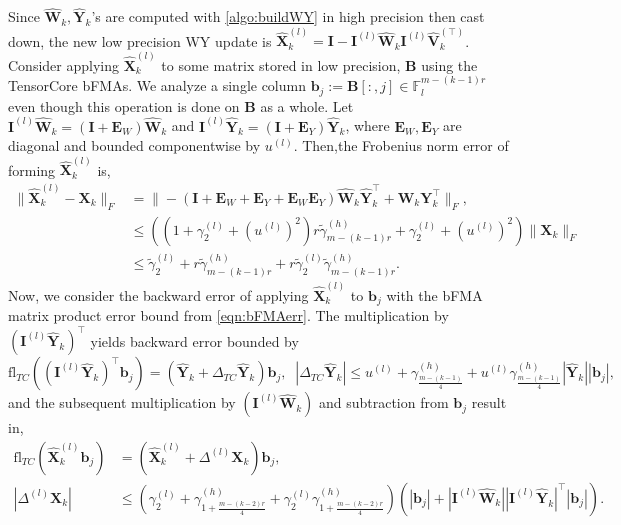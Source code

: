 \documentclass[review,onefignum,onetabnum]{siamart190516}
\newcommand{\F}{\mathbb{F}}
\newcommand{\bb}[1]{\mathbf{#1}}
\newcommand{\fl}{\mathrm{fl}}
\begin{document}
Since $\hat{\bb{W}}_{k},\hat{\bb{Y}}_k$'s are computed with \cref{algo:buildWY} in high precision then cast down, the new low precision WY update is $\hat{\bb{X}}_{k}^{(l)} = \bb{I}-\bb{I}^{(l)}\hat{\bb{W}}_k\bb{I}^{(l)}\hat{\bb{V}}_k^{(\top)}$.
Consider applying $\hat{\bb{X}}_k^{(l)}$ to some matrix stored in low precision, $\bb{B}$ using the TensorCore bFMAs.
We analyze a single column $\bb{b}_j:=\bb{B}[:,j] \in \F_l^{m-(k-1)r}$ even though this operation is done on $\bb{B}$ as a whole.
Let $\bb{I}^{(l)}\hat{\bb{W}}_k = (\bb{I}+\bb{E}_W)\hat{\bb{W}}_k$ and $\bb{I}^{(l)}\hat{\bb{Y}}_k = (\bb{I}+\bb{E}_Y)\hat{\bb{Y}}_k$, where $\bb{E}_W,\bb{E}_Y$ are diagonal and bounded componentwise by $u^{(l)}$.
Then,the Frobenius norm error of forming $\hat{\bb{X}}_{k}^{(l)}$ is,
\begin{align*}
	\|\hat{\bb{X}}_{k}^{(l)}- \bb{X}_{k}\|_F  &= \|-\left(\bb{I}+\bb{E}_W+\bb{E}_Y+ \bb{E}_W\bb{E}_Y\right)\hat{\bb{W}}_k\hat{\bb{Y}}_k^{\top} + \bb{W}_k\bb{Y}_k^{\top}\|_F,\\
	&\leq \left((1+\gamma_2^{(l)}+(u^{(l)})^2)r\tilde{\gamma}_{m-(k-1)r}^{(h)}+\gamma_2^{(l)}+(u^{(l)})^2\right)\|\bb{X}_k\|_F\\
	&\leq \tilde{\gamma}_2^{(l)} +r\tilde{\gamma}_{m-(k-1)r}^{(h)} + r\tilde{\gamma}_2^{(l)}\tilde{\gamma}_{m-(k-1)r}^{(h)}.
\end{align*}
Now, we consider the backward error of applying $\hat{\bb{X}}_{k}^{(l)}$ to $\bb{b}_j$ with the bFMA matrix product error bound from \cref{eqn:bFMAerr}.
The multiplication by $(\bb{I}^{(l)}\hat{\bb{Y}}_k)^{\top}$ yields backward error bounded by
\begin{equation*}
	\fl_{TC}((\bb{I}^{(l)}\hat{\bb{Y}}_k)^{\top}\bb{b}_j) = (\hat{\bb{Y}}_k+\Delta_{TC}\hat{\bb{Y}}_k)\bb{b}_j,\;\;|\Delta_{TC}\hat{\bb{Y}}_k| \leq u^{(l)}+\gamma_{\frac{m-(k-1)}{4}}^{(h)}+u^{(l)}\gamma_{\frac{m-(k-1)}{4}}^{(h)}|\hat{\bb{Y}}_k||\bb{b}_j|,
\end{equation*}
and the subsequent multiplication by $(\bb{I}^{(l)}\hat{\bb{W}}_k)$ and subtraction from $\bb{b}_j$ result in,
\begin{align*}
	\fl_{TC}(\hat{\bb{X}}_{k}^{(l)}\bb{b}_j) &= (\hat{\bb{X}}_{k}^{(l)}+\Delta^{(l)}\bb{X}_k)\bb{b}_j,\\
	|\Delta^{(l)}\bb{X}_k| &\leq \left(\gamma_2^{(l)}+\gamma_{1+\frac{m-(k-2)r}{4}}^{(h)}+\gamma_2^{(l)}\gamma_{1+\frac{m-(k-2)r}{4}}^{(h)}\right)\left(|\bb{b}_j|+|\bb{I}^{(l)}\hat{\bb{W}}_k||\bb{I}^{(l)}\hat{\bb{Y}}_k|^{\top}|\bb{b}_j|\right).
\end{align*}
\end{document}
